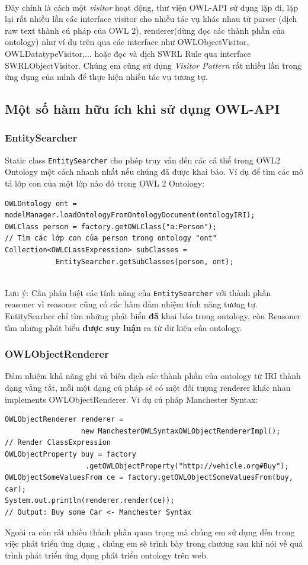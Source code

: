 \\
Đây chính là cách một \textit{visitor} hoạt động, thư viện OWL-API sử dụng lặp đi, lặp lại rất nhiều lần các interface visitor cho nhiều tác vụ khác nhau từ parser (dịch raw text thành cú pháp của OWL 2), renderer(dùng đọc các thành phần của ontology) như ví dụ trên qua các interface như OWLObjectVisitor, OWLDatatypeVisitor,... hoặc đọc và dịch SWRL Rule qua interface SWRLObjectVisitor. Chúng em cũng sử dụng \textit{Visitor Pattern} rất nhiều lần trong ứng dụng của mình để thực hiện nhiều tác vụ tương tự.
\subsection{Một số hàm hữu ích khi sử dụng OWL-API}
\subsubsection{EntitySearcher}
Static class \verb|EntitySearcher| cho phép truy vấn đến các cá thể trong OWL2 Ontology một cách nhanh nhất nếu chúng đã được khai báo. Ví dụ để tìm các mô tả lớp con của một lớp nào đó trong OWL 2 Ontology:
\begin{verbatim}
OWLOntology ont = modelManager.loadOntologyFromOntologyDocument(ontologyIRI);
OWLClass person = factory.getOWLClass("a:Person");
// Tìm các lớp con của person trong ontology "ont"
Collection<OWLCLassExpression> subClasses = 
			EntitySearcher.getSubClasses(person, ont);
			
\end{verbatim}
Lưu ý: Cần phân biệt các tính năng của \verb|EntitySearcher| với thành phần reasoner vì reasoner cũng có các hàm đảm nhiệm tính năng tương tự. EntitySearher chỉ tìm những phát biểu \textbf{đã} khai báo trong ontology, còn Reasoner tìm những phát biểu \textbf{được suy luận} ra từ dữ kiện của ontology.

\subsubsection{OWLObjectRenderer}
Đảm nhiệm khả năng ghi và biên dịch các thành phần của ontology từ IRI thành dạng vắng tắt, mỗi một dạng cú pháp sẽ có một đối tượng renderer khác nhau implements OWLObjectRenderer. Ví dụ cú pháp Manchester Syntax:
\begin{verbatim}
OWLObjectRenderer renderer = 
                  new ManchesterOWLSyntaxOWLObjectRendererImpl();
// Render ClassExpression
OWLObjectProperty buy = factory
                   .getOWLObjectProperty("http://vehicle.org#Buy");
OWLObjectSomeValuesFrom ce = factory.getOWLObjectSomeValuesFrom(buy, car);
System.out.println(renderer.render(ce));
// Output: Buy some Car <- Manchester Syntax
\end{verbatim}
Ngoài ra còn rất nhiều thành phần quan trọng mà chúng em sử dụng đến trong việc phát triển ứng dụng , chúng em sẽ trình bày trong chương sau khi nói về quá trình phát triển ứng dụng phát triển ontology trên web.
